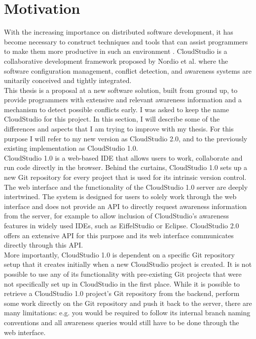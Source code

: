 \section{Motivation}




With the increasing importance on distributed software development, it has become necessary to construct techniques and tools that can assist programmers to make them more productive in such an environment \cite{ref13}. CloudStudio is a collaborative development framework proposed by Nordio et al. \cite{ref12, ref28} where the software configuration management, conflict detection, and awareness systems are unitarily conceived and tightly integrated. \\

This thesis is a proposal at a new software solution, built from ground up, to provide programmers with extensive and relevant awareness information and a mechanism to detect possible conflicts early. I was asked to keep the name CloudStudio for this project. In this section, I will describe some of the differences and aspects that I am trying to improve with my thesis. For this purpose I will refer to my new version as CloudStudio 2.0, and to the previously existing implementation as CloudStudio 1.0. \\

CloudStudio 1.0 is a web-based IDE that allows users to work, collaborate and run code directly in the browser. Behind the curtains, CloudStudio 1.0 sets up a new Git repository for every project that is used for its intrinsic version control. \\

The web interface and the functionality of the CloudStudio 1.0 server are deeply intertwined. The system is designed for users to solely work through the web interface and does not provide an API to directly request awareness information from the server, for example to allow inclusion of CloudStudio's awareness features in widely used IDEs, such as EiffelStudio \cite{ref26} or Eclipse. CloudStudio 2.0 offers an extensive API for this purpose and its web interface communicates directly through this API. \\

More importantly, CloudStudio 1.0 is dependent on a specific Git repository setup that it creates initially when a new CloudStudio project is created. It is not possible to use any of its functionality with pre-existing Git projects that were not specifically set up in CloudStudio in the first place. While it is possible to retrieve a CloudStudio 1.0 project's Git repository from the backend, perform some work directly on the Git repository and push it back to the server, there are many limitations: e.g. you would be required to follow its internal branch naming conventions and all awareness queries would still have to be done through the web interface. \\

